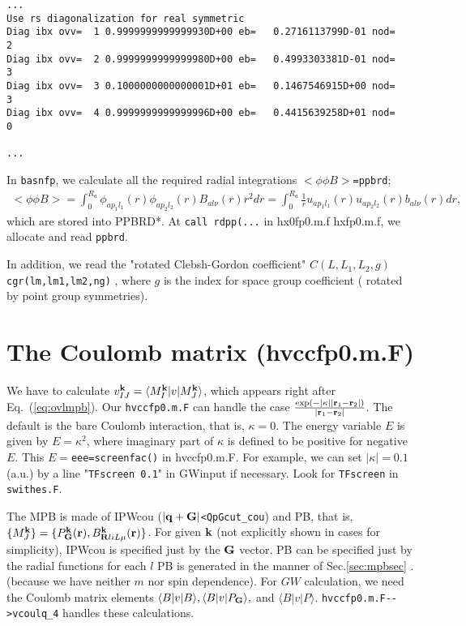 \documentclass[a4paper,10pt,fleqn]{article}
\newcommand{\bfq}{{\bf q}}
\newcommand{\bfk}{{\bf k}}
\newcommand{\bfr}{{\bf r}}
\newcommand{\bfG}{{\bf G}}
\newcommand{\bfR}{{\bf R}}
\newcommand{\io}[1]{{\sf  #1}}
\newcommand{\req}[1]{\mbox{Eq.~(\ref{#1})}}
\begin{document}
{\baselineskip=4mm
\begin{verbatim}
...
Use rs diagonalization for real symmetric 
Diag ibx ovv=  1 0.9999999999999930D+00 eb=   0.2716113799D-01 nod=   2
Diag ibx ovv=  2 0.9999999999999980D+00 eb=   0.4993303381D-01 nod=   3
Diag ibx ovv=  3 0.1000000000000001D+01 eb=   0.1467546915D+00 nod=   3
Diag ibx ovv=  4 0.9999999999999996D+00 eb=   0.4415639258D+01 nod=   0

...
\end{verbatim}
}

In \verb|basnfp|, we calculate all the required 
radial integrations $<\phi \phi B>$\verb!=ppbrd!;
\begin{eqnarray}
   <\phi \phi B> = \int_0^{R_a}
   \phi_{ap_1 l_1}(r) \phi_{ap_2 l_2}(r) B_{al\nu}(r) r^2 dr
   = \int_0^{R_a} \frac{1}{r}
     u_{ap_1l_1}(r) u_{ap_2l_2}(r) b_{al\nu}(r) dr,
\end{eqnarray}
which are stored into \io{PPBRD*}.  
At \verb!call rdpp(...! in {\sf hx0fp0.m.f hxfp0.m.f},
we allocate and read \verb!ppbrd!. 

In addition, we read the "rotated Clebsh-Gordon coefficient"
$C(L,L_1,L_2,g)$ \verb!cgr(lm,lm1,lm2,ng)! 
, where $g$ is the index for space group
coefficient ( rotated by point group symmetries).




\section{The Coulomb matrix (hvccfp0.m.F)}
We have to calculate
$v_{IJ}^\bfk= \langle M^{\bf k}_{I} |v|  M^{\bf k}_J \rangle$, which
appears right after \req{eq:ovlmpb}.
Our \verb#hvccfp0.m.F# can handle the
case $\frac{\exp(- |\kappa| |\bfr_1-\bfr_2|)}{|\bfr_1-\bfr_2|}$.
The default is the bare Coulomb interaction, that is, $\kappa=0$. 
The energy variable $E$ is given by $E=\kappa^2$, where
imaginary part of $\kappa$ is defined to be positive for negative $E$.
This $E=$\verb#eee=screenfac()# in hvccfp0.m.F. 
For example, we can set $|\kappa|=0.1$ (a.u.) by a line
"{\tt TFscreen 0.1}" in \io{GWinput} if necessary. Look for {\tt TFscreen} in \verb#swithes.F#.

The MPB is made of IPWcou ($|\bfq+\bfG|$\verb#<QpGcut_cou#) and PB,
that is, $\{M^{\bf k}_J\}=\{P_\bfG^\bfk(\bfr), B^\bfk_{\bfR{liL}\mu}(\bfr)\}$.
For given $\bfk$ (not explicitly shown in cases for simplicity), 
IPWcou is specified just by the $\bfG$ vector.
PB can be specified just by the radial functions for each $l$ 
PB is generated in the manner of Sec.\ref{sec:mpbsec} . 
(because we have neither $m$ nor spin dependence).
For $GW$ calculation, we need the Coulomb matrix elements
$\langle B|v|B \rangle,\langle B|v|P_\bfG \rangle,$ and $\langle B|v|P \rangle$.
\verb#hvccfp0.m.F-->vcoulq_4# handles these calculations.
\end{document}
